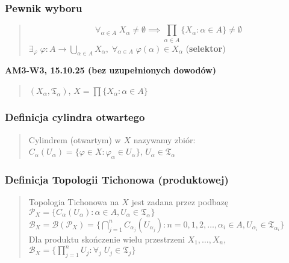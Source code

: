 \documentclass[10pt,a4paper]{article}
\newcommand{\zagadnienie}[3]{%
    \clearpage %
    \noindent\textbf{#1} #2\\
    #3
}
\begin{document}
{    \subsubsection*{Pewnik wyboru}
    \begin{quote}
    $$\forall_{\alpha \in A} \; X_{\alpha} \neq \emptyset \implies \prod_{\alpha \in A} \{X_{\alpha} : \alpha \in A\} \neq \emptyset$$
    $\exists_{\varphi} \; \varphi : A \to \bigcup_{\alpha \in A} X_{\alpha}, \; \forall_{\alpha \in A} \; \varphi(\alpha) \in X_{\alpha}$ (\textbf{selektor})
    \end{quote}
}

\zagadnienie{AM3-W3, 15.10.25 (bez uzupełnionych dowodów)}{}
{

    \begin{quote}
    $(X_\alpha, \mathfrak{T}_\alpha)$, $X = \prod \{X_\alpha : \alpha \in A\}$ \\
    \end{quote}

    \subsubsection*{Definicja cylindra otwartego}
    \begin{quote}
    Cylindrem (otwartym) w $X$ nazywamy zbiór: \\
    $C_\alpha(U_\alpha) = \{\varphi \in X : \varphi_\alpha \in U_\alpha\}$, $U_\alpha \in \mathfrak{T}_\alpha$
    \end{quote}

    \subsubsection*{Definicja Topologii Tichonowa (produktowej)}
    \begin{quote}
    Topologia Tichonowa na $X$ jest zadana przez podbazę \\
    $\mathcal{P}_X = \{C_\alpha(U_\alpha) : \alpha \in A, U_\alpha \in \mathfrak{T}_\alpha\}$ \\
    $\mathcal{B}_X = \mathcal{B}(\mathcal{P}_X) = \{\bigcap_{j=1}^n C_{\alpha_j}(U_{\alpha_j}) : n=0,1,2,\dots, \alpha_i \in A, U_{\alpha_i} \in \mathfrak{T}_{\alpha_i}\}$ \\
    Dla produktu skończenie wielu przestrzeni $X_1, \dots, X_n$, \\
    $\mathcal{B}_X = \{\prod_{j=1}^n U_j : \forall_j \; U_j \in \mathfrak{T}_j\}$
    \end{quote}
    }
\end{document}
